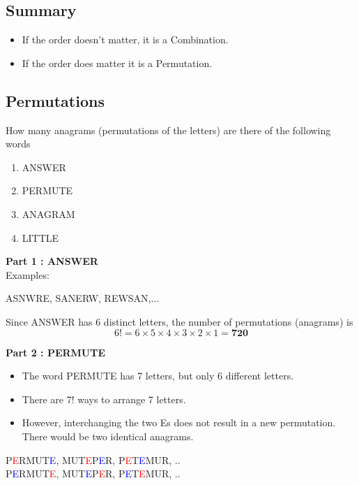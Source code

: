 \documentclass[12pt]{report}
\begin{document}
		\subsection*{Summary}
		\begin{itemize}
			\item If the order doesn't matter, it is a Combination.
			\item If the order does matter it is a Permutation.
		\end{itemize}
		
		\subsection{Permutations}
	
		How many anagrams (permutations of the letters) are there of the following words
		\begin{enumerate}
			\item ANSWER
			\item PERMUTE
			\item ANAGRAM
			\item LITTLE
		\end{enumerate}
		
		
		\textbf{Part 1 : ANSWER}\\
		Examples:
		\begin{center}
			ASNWRE,\;
			SANERW,\;
			REWSAN,\;...
		\end{center}
		
		Since ANSWER has 6 distinct letters, the number of permutations (anagrams) is
		\LARGE
		\[6! = 6\times 5 \times 4 \times 3 \times 2\times 1 = \boldsymbol{720} \]
		
		\vspace{-0.3cm}
		\textbf{Part 2 : PERMUTE}\\
		\begin{itemize}
			\item The word PERMUTE has 7 letters, but only 6 different letters. 
			\item There are 7! ways to arrange 7 letters.
			\item However, interchanging the two Es does not result in a new permutation. There would be two identical anagrams.
		\end{itemize}
		
		\begin{center}
			P\textcolor{red}{E}RMUT\textcolor{blue}{E}, \; MUT\textcolor{red}{E}P\textcolor{blue}{E}R, \; P\textcolor{red}{E}T\textcolor{blue}{E}MUR,\; ..\\
			P\textcolor{blue}{E}RMUT\textcolor{red}{E}, \; MUT\textcolor{blue}{E}P\textcolor{red}{E}R, \; P\textcolor{blue}{E}T\textcolor{red}{E}MUR,\; ..
		\end{center}
		
\end{document}

